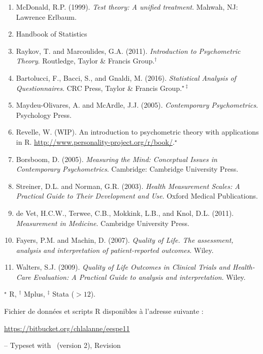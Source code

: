 \begin{enumerate}
\item McDonald, R.P. (1999). \emph{Test theory: A unified treatment}. Mahwah,
  NJ: Lawrence Erlbaum.
\item Handbook of Statistics
\item Raykov, T. and Marcoulides, G.A. (2011). \emph{Introduction to
    Psychometric Theory}. Routledge, Taylor \& Francis Group.$^\dagger$
\item Bartolucci, F., Bacci, S., and Gnaldi, M. (2016). \emph{Statistical Analysis of
  Questionnaires}. CRC Press, Taylor \& Francis Group.$^{\star\ddagger}$
\item Maydeu-Olivares, A. and McArdle, J.J. (2005). \emph{Contemporary
    Psychometrics}. Psychology Press.
\item Revelle, W. (WIP). An introduction to psychometric theory with
  applications in R. \url{http://www.personality-project.org/r/book/}.$^\star$
\item Borsboom, D. (2005). \emph{Measuring the Mind: Conceptual Issues in
    Contemporary Psychometrics}. Cambridge: Cambridge University Press.
\item Streiner, D.L. and Norman, G.R. (2003). \emph{Health Measurement Scales: A
    Practical Guide to Their Development and Use}. Oxford Medical Publications.
\item de Vet, H.C.W., Terwee, C.B., Mokkink, L.B., and Knol, D.L. (2011).
  \emph{Measurement in Medicine}. Cambridge University Press.
\item Fayers, P.M. and Machin, D. (2007). \emph{Quality of Life. The assessment,
  analysis and interpretation of patient-reported outcomes}. Wiley.
\item Walters, S.J. (2009). \emph{Quality of Life Outcomes in Clinical Trials
    and Health-Care Evaluation: A Practical Guide to analysis and
    interpretation}. Wiley.
\end{enumerate}

{\small $^\star$ R, $^\dagger$ Mplus, $^\ddagger$ Stata ($>12$).}

\foilhead{}

Fichier de données et scripts R disponibles à l'adresse suivante :\newline
{\centering \url{https://bitbucket.org/chlalanne/eespe11}\par}
\vfill

\raggedleft \scriptsize -- Typeset with \FoilTeX\ (version 2), Revision \VCRevision






